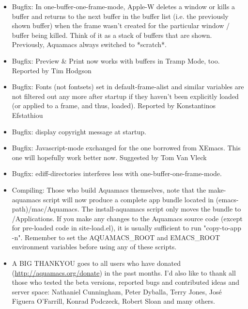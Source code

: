 \begin{itemize}
\item  Bugfix: In one-buffer-one-frame-mode, Apple-W deletes a window
	or kills a buffer and returns to the next buffer in the buffer
	list (i.e. the previously shown buffer) when the frame wasn't
	created for the particular window / buffer being killed. Think of
	it as a stack of buffers that are shown. Previously, Aquamacs
	always switched to *scratch*.

\item  Bugfix: Preview \& Print now works with buffers in Tramp Mode, too.
	Reported by Tim Hodgson

\item  Bugfix: Fonts (not fontsets) set in default-frame-alist and
	similar variables are not filtered out any more after startup if
	they haven't been explicitly loaded (or applied to a frame, and
	thus, loaded).
	Reported by Konstantinos Efstathiou
	
\item  Bugfix: display copyright message at startup. 

\item  Bugfix: Javascript-mode exchanged for the one borrowed from
	XEmacs. This one will hopefully work better now.
	Suggested by Tom Van Vleck

\item  Bugfix: ediff-directories interferes less with one-buffer-one-frame-mode.
	
\item  Compiling: Those who build Aquamacs themselves, note that the
	make-aquamacs script will now produce a complete app bundle
	located in (emacs-path)/mac/Aquamacs. The install-aquamacs script
	only moves the bundle to /Applications. If you make any changes to
	the Aquamacs source code (except for pre-loaded code in
	site-load.el), it is usually sufficient to run 
	"copy-to-app -n". Remember to set the AQUAMACS\_ROOT and EMACS\_ROOT
	environment variables before using any of these scripts.

      \item A BIG THANKYOU goes to all users who have donated
        (\url{http://aquamacs.org/donate}) in the past months. I'd
        also like to thank all those who tested the beta versions,
        reported bugs and contributed ideas and server space:
        Nathaniel Cunningham, Peter Dyballa, Terry Jones, José Figuera
        O'Farrill, Konrad Podczeck, Robert Sloan and many others.

\end{itemize}

